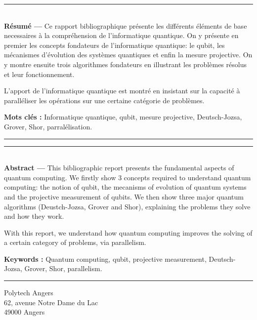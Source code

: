 \documentclass[12pt,a4paper]{report}
\begin{document}
\clearpage
{}



\clearpage
\thispagestyle{empty}

\vspace*{\fill}
\noindent\rule[2pt]{\textwidth}{0.5pt}\\
{\textbf{Résumé ---}}
Ce rapport bibliographique présente les différents éléments de base necessaires à la compréhension de l'informatique quantique. On y présente en premier les concepts fondateurs de l'informatique quantique: le qubit, les mécanismes d'évolution des systèmes quantiques et enfin la mesure projective. On y montre ensuite trois algorithmes fondateurs en illustrant les problèmes résolus et leur fonctionnement.

L'apport de l'informatique quantique est montré en insistant sur la capacité à paralléliser les opérations sur une certaine catégorie de problèmes.

{\textbf{Mots clés :}}
Informatique quantique, qubit, mesure projective, Deutsch-Jozsa, Grover, Shor, parralélisation.
\\
\noindent\rule[2pt]{\textwidth}{0.5pt}


\vspace*{\fill}
\noindent\rule[2pt]{\textwidth}{0.5pt}\\
{\textbf{Abstract ---}}
This bibliographic report presents the fundamental aspects of quantum computing. We firstly show 3 concepts required to understand quantum computing: the notion of qubit, the mecanisms of evolution of quantum systems and the projective measurement of qubits. We then show three major quantum algorithms (Deustch-Jozsa, Grover and Shor), explaining the problems they solve and how they work.

With this report, we understand how quantum computing improves the solving of a certain category of problems, via parallelism. 

{\textbf{Keywords :}}
Quantum computing, qubit, projective measurement, Deutsch-Jozsa, Grover, Shor, parallelism.
\\
\noindent\rule[2pt]{\textwidth}{0.5pt}

\begin{center}
  Polytech Angers\\
  62, avenue Notre Dame du Lac\\
  49000 Angers
\end{center}
\vspace*{\fill}
\end{document}
